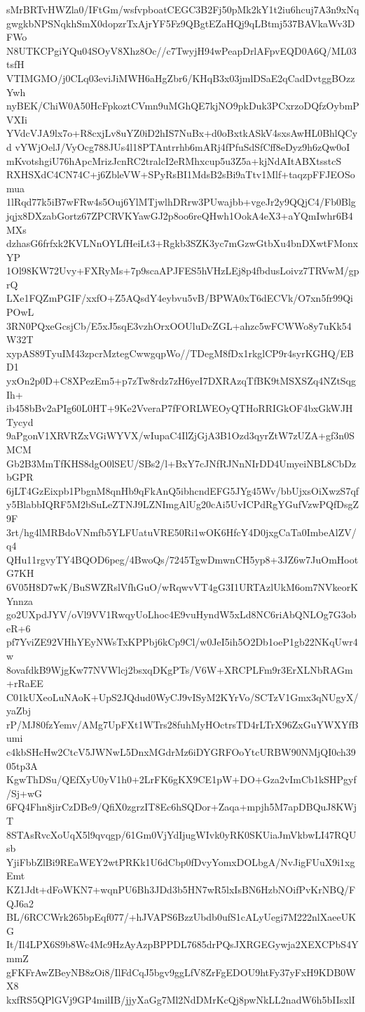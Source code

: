 sMrBRTvHWZla0/IFtGm/wsfvpboatCEGC3B2Fj50pMk2kY1t2iu6hcuj7A3n9xNq
gwgkbNPSNqkhSmX0dopzrTxAjrYF5Fz9QBgtEZaHQj9qLBtmj537BAVkaWv3DFWo
N8UTKCPgiYQu04SOyV8Xhz8Oc//c7TwyjH94wPeapDrlAFpvEQD0A6Q/ML03tsfH
VTIMGMO/j0CLq03eviJiMWH6aHgZbr6/KHqB3x03jmlDSaE2qCadDvtggBOzzYwh
nyBEK/ChiW0A50HcFpkoztCVmn9uMGhQE7kjNO9pkDuk3PCxrzoDQfzOybmPVXIi
YVdcVJA9lx7o+R8cxjLv8uYZ0iD2hIS7NuBx+d0oBxtkASkV4sxsAwHL0BhlQCyd
vYWjOelJ/VyOcg788JUs4l18PTAntrrhb6mARj4fPfuSdSfCff8eDyz9h6zQw0oI
mKvotshgiU76hApcMrizJcnRC2tralcI2eRMhxcup5u3Z5a+kjNdAItABXtsstcS
RXHSXdC4CN74C+j6ZbleVW+SPyRsBI1MdsB2sBi9aTtv1Mlf+taqzpFFJEOSomua
1lRqd77k5iB7wFRw4s5Ouj6YlMTjwlhDRrw3PUwajbb+vgeJr2y9QQjC4/Fb0Blg
jqjx8DXzabGortz67ZPCRVKYawGJ2p8oo6reQHwh1OokA4eX3+aYQmIwhr6B4MXs
dzhasG6frfxk2KVLNnOYLfHeiLt3+Rgkb3SZK3yc7mGzwGtbXu4bnDXwtFMonxYP
1Ol98KW72Uvy+FXRyMs+7p9scaAPJFES5hVHzLEj8p4fbdusLoivz7TRVwM/gprQ
LXe1FQZmPGIF/xxfO+Z5AQsdY4eybvu5vB/BPWA0xT6dECVk/O7xn5fr99QiPOwL
3RN0PQxeGcsjCb/E5xJ5sqE3vzhOrxOOUluDcZGL+ahzc5wFCWWo8y7uKk54W32T
xypAS89TyuIM43zpcrMztegCwwgqpWo//TDegM8fDx1rkglCP9r4syrKGHQ/EBD1
yxOn2p0D+C8XPezEm5+p7zTw8rdz7zH6yeI7DXRAzqTfBK9tMSXSZq4NZtSqgIh+
ib458bBv2aPIg60L0HT+9Ke2VveraP7fFORLWEOyQTHoRRIGkOF4bxGkWJHTycyd
9aPgonV1XRVRZxVGiWYVX/wIupaC4IlZjGjA3B1Ozd3qyrZtW7zUZA+gf3n0SMCM
Gb2B3MmTfKHS8dgO0lSEU/SBs2/l+BxY7cJNfRJNnNIrDD4UmyeiNBL8CbDzbGPR
6jLT4GzEixpb1PbgnM8qnHb9qFkAnQ5ibhcndEFG5JYg45Wv/bbUjxsOiXwzS7qf
y5BlabbIQRF5M2bSuLeZTNJ9LZNImgAlUg20cAi5UvICPdRgYGufVzwPQfDsgZ9F
3rt/hg4lMRBdoVNmfb5YLFUatuVRE50Ri1wOK6HfcY4D0jxgCaTa0ImbeAlZV/q4
QHu11rgvyTY4BQOD6peg/4BwoQs/7245TgwDmwnCH5yp8+3JZ6w7JuOmHootG7KH
6V05H8D7wK/BuSWZRslVfhGuO/wRqwvVT4gG3I1URTAzlUkM6om7NVkeorKYnnza
go2UXpdJYV/oVl9VV1RwqyUoLhoc4E9vuHyndW5xLd8NC6riAbQNLOg7G3obeR+6
pf7YviZE92VHhYEyNWsTxKPPbj6kCp9Cl/w0JeI5ih5O2Db1oeP1gb22NKqUwr4w
8ovafdkB9WjgKw77NVWlcj2bsxqDKgPTs/V6W+XRCPLFm9r3ErXLNbRAGm+rRaEE
C01kUXeoLuNAoK+UpS2JQdud0WyCJ9vISyM2KYrVo/SCTzV1Gmx3qNUgyX/yaZbj
rP/MJ80fzYemv/AMg7UpFXt1WTrs28fuhMyHOctrsTD4rLTrX96ZxGuYWXYfBumi
c4kbSHcHw2CtcV5JWNwL5DnxMGdrMz6iDYGRFOoYtcURBW90NMjQI0ch3905tp3A
KgwThDSu/QEfXyU0yV1h0+2LrFK6gKX9CE1pW+DO+Gza2vImCb1kSHPgyf/Sj+wG
6FQ4Fhn8jirCzDBe9/QfiX0zgrzIT8Ec6hSQDor+Zaqa+mpjh5M7apDBQuJ8KWjT
8STAsRvcXoUqX5l9qvqgp/61Gm0VjYdIjugWIvk0yRK0SKUiaJmVkbwLI47RQUsb
YjiFbbZlBi9REaWEY2wtPRKk1U6dCbp0fDvyYomxDOLbgA/NvJigFUuX9i1xgEmt
KZ1Jdt+dFoWKN7+wqnPU6Bh3JDd3b5HN7wR5lxIsBN6HzbNOifPvKrNBQ/FQJ6a2
BL/6RCCWrk265bpEqf077/+hJVAPS6BzzUbdb0ufS1cALyUegi7M222nlXaeeUKG
It/Il4LPX6S9b8Wc4Mc9HzAyAzpBPPDL7685drPQsJXRGEGywja2XEXCPbS4YmmZ
gFKFrAwZBeyNB8zOi8/IlFdCqJ5bgv9ggLfV8ZrFgEDOU9htFy37yFxH9KDB0WX8
kxfRS5QPlGVj9GP4milIB/jjyXaGg7Ml2NdDMrKcQj8pwNkLL2nadW6h5bIIsxlI
